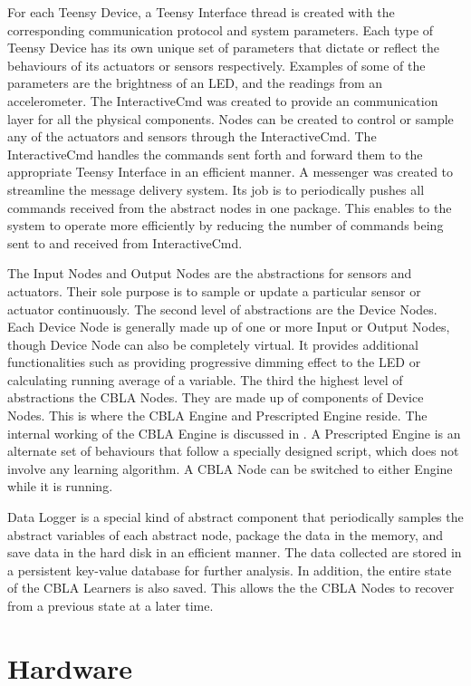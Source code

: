 For each Teensy Device, a Teensy Interface thread is created with the corresponding communication protocol and system parameters. Each type of Teensy Device has its own unique set of parameters that dictate or reflect the behaviours of its actuators or sensors respectively. Examples of some of the parameters are the brightness of an LED, and the readings from an accelerometer. The InteractiveCmd was created to provide an communication layer for all the physical components. Nodes can be created to control or sample any of the actuators and sensors through the InteractiveCmd. The InteractiveCmd handles the commands sent forth and forward them to the appropriate Teensy Interface in an efficient manner. A messenger was created to streamline the message delivery system. Its job is to periodically pushes all commands received from the abstract nodes in one package. This enables to the system to operate more efficiently by reducing the number of commands being sent to and received from InteractiveCmd. 

The Input Nodes and Output Nodes are the abstractions for sensors and actuators. Their sole purpose is to sample or update a particular sensor or actuator continuously. The second level of abstractions are the Device Nodes. Each Device Node is generally made up of one or more Input or Output Nodes, though Device Node can also be completely virtual. It provides additional functionalities such as providing progressive dimming effect to the LED or calculating running average of a variable. The third the highest level of abstractions the CBLA Nodes. They are made up of components of Device Nodes. This is where the CBLA Engine and Prescripted Engine reside. The internal working of the CBLA Engine is discussed in . A Prescripted Engine is an alternate set of behaviours that follow a specially designed script, which does not involve any learning algorithm. A CBLA Node can be switched to either Engine while it is running. 

Data Logger is a special kind of abstract component that periodically samples the abstract variables of each abstract node, package the data in the memory, and save data in the hard disk in an efficient manner. The data collected are stored in a persistent key-value database for further analysis. In addition, the entire state of the CBLA Learners is also saved. This allows the the CBLA Nodes to recover from a previous state at a later time.


\section{Hardware} \label{sec:hardware}

